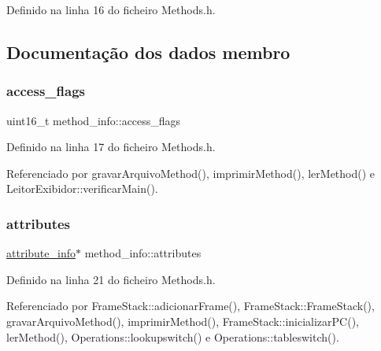 Definido na linha 16 do ficheiro Methods.\+h.



\subsection{Documentação dos dados membro}
\mbox{\label{structmethod__info_a8fc68aba419f2617deda879c467f5410}} 
\subsubsection{\texorpdfstring{access\+\_\+flags}{access\_flags}}
{\footnotesize\ttfamily uint16\+\_\+t method\+\_\+info\+::access\+\_\+flags}



Definido na linha 17 do ficheiro Methods.\+h.



Referenciado por gravar\+Arquivo\+Method(), imprimir\+Method(), ler\+Method() e Leitor\+Exibidor\+::verificar\+Main().

\mbox{\label{structmethod__info_a8ce4caaa03680c91f548558a38647ad8}} 
\subsubsection{\texorpdfstring{attributes}{attributes}}
{\footnotesize\ttfamily \hyperlink{structattribute__info}{attribute\+\_\+info}$\ast$ method\+\_\+info\+::attributes}



Definido na linha 21 do ficheiro Methods.\+h.



Referenciado por Frame\+Stack\+::adicionar\+Frame(), Frame\+Stack\+::\+Frame\+Stack(), gravar\+Arquivo\+Method(), imprimir\+Method(), Frame\+Stack\+::inicializar\+P\+C(), ler\+Method(), Operations\+::lookupswitch() e Operations\+::tableswitch().

\mbox{\label{structmethod__info_a9e711e4dfb8181f7dce16c6f640ba734}} 

